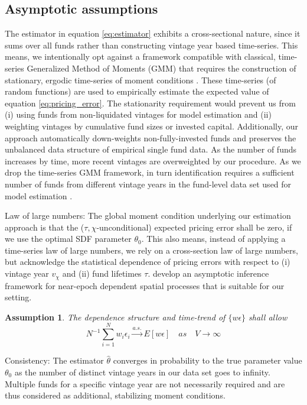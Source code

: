 \documentclass[12pt]{article}
\newtheorem{assume}{Assumption}
\begin{document}
\subsection{Asymptotic assumptions}

The estimator in equation \ref{eq:estimator} exhibits a cross-sectional nature, since it sums over all funds rather than constructing vintage year based time-series.
This means, we intentionally opt against a framework compatible with classical, time-series Generalized Method of Moments (GMM) that requires the construction of stationary, ergodic time-series of moment conditions \citep{H82,H12}.
These time-series (of random functions) are used to empirically estimate the expected value of equation \ref{eq:pricing_error}.
The stationarity requirement would prevent us from (i) using funds from non-liquidated vintages for model estimation and (ii) weighting vintages by cumulative fund sizes or invested capital.
Additionally, our approach automatically down-weights non-fully-invested funds and preserves the unbalanced data structure of empirical single fund data.
As the number of funds increases by time, more recent vintages are overweighted by our procedure.
As we drop the time-series GMM framework, in turn identification requires a sufficient number of funds from different vintage years in the fund-level data set used for model estimation \citep{DLP12,KN16}.

Law of large numbers:
The global moment condition underlying our estimation approach is that the ($\tau,\chi$-unconditional) expected pricing error shall be zero, if we use the optimal SDF parameter $\theta_0$. 
This also means, instead of applying a time-series law of large numbers, we rely on a cross-section law of large numbers, but acknowledge the statistical dependence of  pricing errors with respect to (i) vintage year $v_{\chi}$ and (ii) fund lifetimes $\tau$.
\cite{JP12} develop an asymptotic inference framework for near-epoch dependent spatial processes that is suitable for our setting.

\begin{assume}
	The dependence structure and time-trend of $\{w\epsilon\}$ shall allow
	\[
	N^{-1} \sum_{i=1}^N w_i \epsilon_i \overset{a.s.}\to E[w \epsilon]
	\quad {as} \quad V \to \infty
	\]
\end{assume}
	
Consistency: 
The estimator $\hat{\theta}$ converges in probability to the true parameter value $\theta_0$ as the number of distinct vintage years in our data set goes to infinity.
Multiple funds for a specific vintage year are not necessarily required and are thus considered as additional, stabilizing moment conditions.
\end{document}

